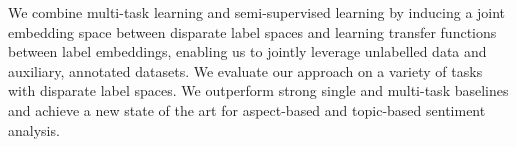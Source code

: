 We combine multi-task learning and semi-supervised learning by inducing a joint embedding space between disparate label spaces and learning transfer functions between label embeddings, enabling us to jointly leverage unlabelled data and auxiliary, annotated datasets. We evaluate our approach on a variety of tasks with disparate label spaces. We outperform strong single and multi-task baselines and achieve a new state of the art for aspect-based and topic-based sentiment analysis.
